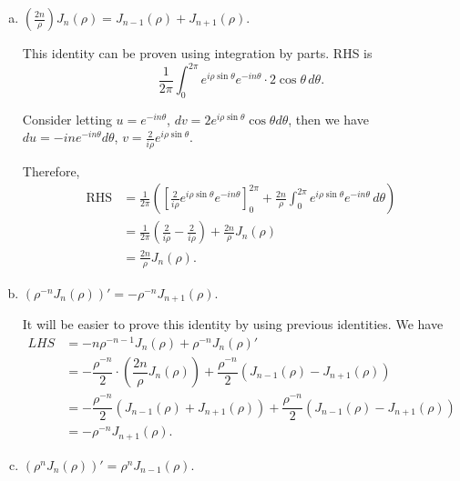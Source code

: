 \documentclass{article}
\begin{document}
\begin{enumerate}
\begin{enumerate}[(a)]
        \item $\left(\frac{2n}\rho\right) J_n(\rho) = J_{n-1}(\rho) + J_{n+1}(\rho)$.
        
        \begin{solution}
            This identity can be proven using integration by parts. RHS is 
            $$\frac1{2\pi} \int_0^{2\pi} e^{i\rho\sin\theta} e^{-in\theta} \cdot 2\cos\theta \, d\theta.$$

            Consider letting $u=e^{-in\theta}$, $dv=2e^{i\rho\sin\theta} \cos\theta d\theta$, then we have 
            $du =-in e^{-in\theta} d\theta$, $v = \frac2{i\rho} e^{i\rho \sin\theta}. $

            Therefore, 
            \begin{align*}
                \text{RHS} &= \frac1{2\pi} \left(\left[\frac2{i\rho}e^{i\rho\sin\theta} e^{-in\theta}\right]_0^{2\pi} 
                    + \frac{2n}\rho\int_0^{2\pi} e^{i\rho\sin\theta}e^{-in\theta}\, d\theta\right) \\
                    &= \frac1{2\pi} \left(\frac2{i\rho} - \frac2{i\rho}\right) + \frac{2n}\rho J_n(\rho) \\
                    &= \frac{2n}\rho J_n(\rho).
            \end{align*}
        \end{solution}

        \item $(\rho^{-n}J_n(\rho))' = -\rho^{-n}J_{n+1}(\rho)$. 
        
        \begin{solution}
            It will be easier to prove this identity by using previous identities. We have
            \begin{align*}
                LHS &= -n\rho^{-n-1}J_n(\rho) + \rho^{-n}J_n(\rho)' \\
                &= -\dfrac{\rho^{-n}}{2} \cdot \left(\dfrac{2n}\rho J_n(\rho)\right) + \dfrac{\rho^{-n}}2(J_{n-1}(\rho) - J_{n+1}(\rho)) \\
                &= -\dfrac{\rho^{-n}}2(J_{n-1}(\rho) + J_{n+1}(\rho)) + \dfrac{\rho^{-n}}2(J_{n-1}(\rho) - J_{n+1}(\rho)) \\
                &= -\rho^{-n} J_{n+1}(\rho).
            \end{align*}
        \end{solution}

        \item $(\rho^n J_n(\rho))' = \rho^n J_{n-1}(\rho)$.
        

\end{enumerate}
\end{enumerate}
\end{document}
